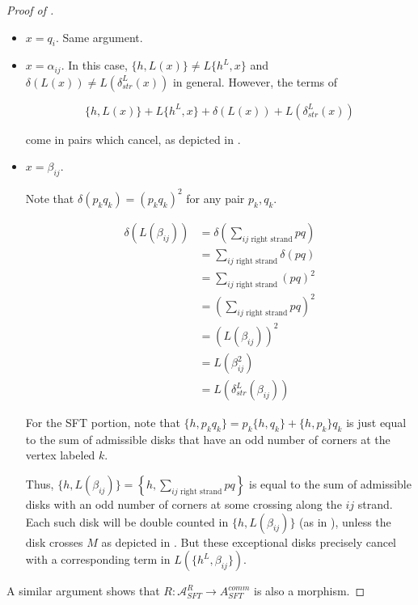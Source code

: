 \documentclass[a4paper,final, reqno]{amsart}
\theoremstyle{plain}
\theoremstyle{definition}
\newcommand{\A}{\mathcal{A}}
\begin{document}
\begin{proof} [Proof of ]
\begin{itemize}
			
			
			Thus, any summand of $\{h, p_i\}$ cancels with a summand of $L(\{h^L, p_i\})$. A similar argument shows that every summand of $L(\{h^L, p_i\})$ cancels with a summand of $\{h, p_i\}$, and thus these are equal. 
			
			
			
			\item $x=q_i$. Same argument.
			
			\item $x=\alpha_{ij}$. In this case, $\{h, L(x)\} \neq L\{h^L, x\}$ and $\delta(L(x)) \neq L(\delta_{str}^L(x))$ in general. However, the terms of 
			
			\[ \{h, L(x)\} + L\{h^L, x\} + \delta(L(x)) + L(\delta_{str}^L(x)) \]
			
			come in pairs which cancel, as depicted in .
			
			\item $x = \beta_{ij}$. 
			
			Note that $\delta(p_kq_k) = (p_kq_k)^2$ for any pair $p_k, q_k$.
			
			\begin{align*}
				\delta(L(\beta_{ij})) &= \delta\left(\sum_{ij \text{ right strand}} pq\right) \\
				&= \sum_{ij \text{ right strand}} \delta(pq) \\
				&= \sum_{ij \text{ right strand}} (pq)^2 \\
				&= \left( \sum_{ij \text{ right strand}} pq \right)^2 \\
				&= \left( L(\beta_{ij}) \right)^2 \\
				&= L\left( \beta_{ij}^2 \right) \\
				&= L(\delta_{str}^L(\beta_{ij}))
			\end{align*}
			
			For the SFT portion, note that $\{h, p_kq_k\} = p_k\{h,q_k\} + \{h, p_k\} q_k$ is just equal to the sum of admissible disks that have an odd number of corners at the vertex labeled $k$. 
			
			Thus, $\{h, L(\beta_{ij})\} = \left\{ h, \sum_{ij \text{ right strand}} pq \right\}$ is equal to the sum of admissible disks with an odd number of corners at some crossing along the $ij$ strand. Each such disk will be double counted in $\{h, L(\beta_{ij})\}$ (as in ), unless the disk crosses $M$ as depicted in . But these exceptional disks precisely cancel with a corresponding term in $L(\{h^L, \beta_{ij}\})$. 
			
		\end{itemize}
		
		
		
		A similar argument shows that $R: \A^R_{SFT} \to A^{comm}_{SFT}$ is also a morphism.
		
	\end{proof}
	
\end{document}
